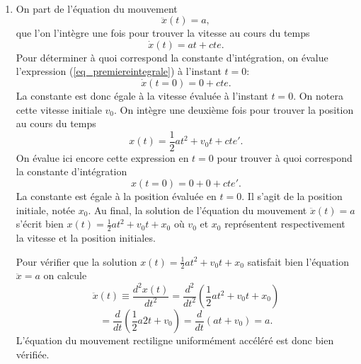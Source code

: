 %
%
\\[-3mm]
\begin{enumerate}
\item
On part de l'\'equation du mouvement
\[
\ddot{x}(t) =  a,
\] 
que l'on l'int\`egre une fois pour trouver la vitesse au cours du temps
\begin{equation}
\dot{x}(t) = at + cte.
\label{eq_premiereintegrale}
\end{equation}
Pour d\'eterminer \`a quoi correspond la constante d'int\'egration, on \'evalue l'expression (\ref{eq_premiereintegrale}) \`a l'instant $t=0$:
\[
\dot{x}(t=0) = 0 + cte. 
\]
La constante est donc \'egale \`a la vitesse \'evalu\'ee \`a l'instant $t=0$. On notera cette vitesse initiale $v_0$. 
On int\`egre une deuxi\`eme fois pour trouver la position au cours du temps
\begin{equation}
x(t) = \frac{1}{2}at^2 + v_0 t + cte'.
\label{eq_deuxiemeintegrale}
\end{equation}
On \'evalue ici encore cette expression en $t=0$ pour trouver \`a quoi correspond la constante d'int\'egration
\[
x(t=0) = 0 + 0 + cte'.
\]
La constante est \'egale \`a la position \'evalu\'ee en $t=0$. Il s'agit de la position initiale, not\'ee $x_0$.
Au final, la solution de l'\'equation du mouvement $\ddot{x}(t) =  a$ s'\'ecrit bien $x(t) = \frac{1}{2}at^2 + v_0 t + x_0$ o\`u $v_0$ et $x_0$ repr\'esentent respectivement la vitesse et la position initiales.

Pour v\'erifier que la solution $x(t)=\frac{1}{2}at^2+v_0t+x_0$ satisfait bien l'\'equation $\ddot{x}=a$ on calcule
\[
\ddot{x}(t) \equiv \frac{d^2x(t)}{dt^2} = \frac{d^2}{dt^2}\left(\frac{1}{2}at^2+v_0t+x_0\right)
\]
\[
= \frac{d}{dt}\left(\frac{1}{2}a2t+v_0\right) = \frac{d}{dt}\left(at+v_0\right) = a.  
\]
L'\'equation du mouvement rectiligne uniform\'ement acc\'el\'er\'e est donc bien v\'erifi\'ee.


\end{enumerate}
